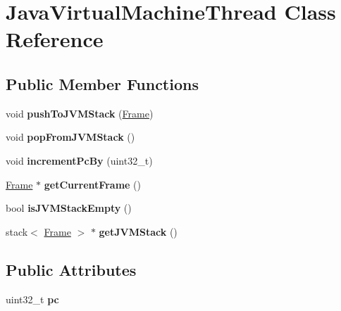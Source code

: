 \hypertarget{classJavaVirtualMachineThread}{}\section{Java\+Virtual\+Machine\+Thread Class Reference}
\label{classJavaVirtualMachineThread}
\subsection*{Public Member Functions}
\begin{DoxyCompactItemize}
\item 
void {\bfseries push\+To\+J\+V\+M\+Stack} (\hyperlink{classFrame}{Frame})\hypertarget{classJavaVirtualMachineThread_a347d58ff764721a09d5f9c50ec0bd573}{}\label{classJavaVirtualMachineThread_a347d58ff764721a09d5f9c50ec0bd573}

\item 
void {\bfseries pop\+From\+J\+V\+M\+Stack} ()\hypertarget{classJavaVirtualMachineThread_a9877108f62d4995127f187e815e0ca84}{}\label{classJavaVirtualMachineThread_a9877108f62d4995127f187e815e0ca84}

\item 
void {\bfseries increment\+Pc\+By} (uint32\+\_\+t)\hypertarget{classJavaVirtualMachineThread_a7df1718d6d280a11c0f062be621fa84c}{}\label{classJavaVirtualMachineThread_a7df1718d6d280a11c0f062be621fa84c}

\item 
\hyperlink{classFrame}{Frame} $\ast$ {\bfseries get\+Current\+Frame} ()\hypertarget{classJavaVirtualMachineThread_acae06bccf2884756745e3aa8c8623f94}{}\label{classJavaVirtualMachineThread_acae06bccf2884756745e3aa8c8623f94}

\item 
bool {\bfseries is\+J\+V\+M\+Stack\+Empty} ()\hypertarget{classJavaVirtualMachineThread_afbf9ff18f47dc417a56cf68f64996aaa}{}\label{classJavaVirtualMachineThread_afbf9ff18f47dc417a56cf68f64996aaa}

\item 
stack$<$ \hyperlink{classFrame}{Frame} $>$ $\ast$ {\bfseries get\+J\+V\+M\+Stack} ()\hypertarget{classJavaVirtualMachineThread_a24d9e850f5e41885d944db2d0040b91b}{}\label{classJavaVirtualMachineThread_a24d9e850f5e41885d944db2d0040b91b}

\end{DoxyCompactItemize}
\subsection*{Public Attributes}
\begin{DoxyCompactItemize}
\item 
uint32\+\_\+t {\bfseries pc}\hypertarget{classJavaVirtualMachineThread_a7edbe3bde50a20b98efed231dfafc2e3}{}\label{classJavaVirtualMachineThread_a7edbe3bde50a20b98efed231dfafc2e3}

\end{DoxyCompactItemize}


